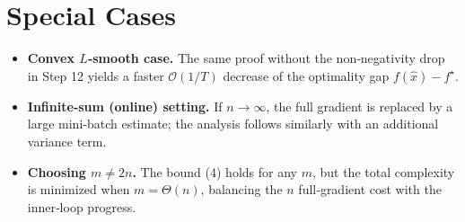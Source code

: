 \documentclass{article}
\begin{document}
\section*{Special Cases}
\begin{itemize}
\item \textbf{Convex $L$‑smooth case.} The same proof without the non‑negativity drop in Step 12 yields a faster $\mathcal{O}(1/T)$ decrease of the optimality gap $f(\hat{x})-f^{\star}$.
\item \textbf{Infinite‑sum (online) setting.} If $n\to\infty$, the full gradient is replaced by a large mini‑batch estimate; the analysis follows similarly with an additional variance term.
\item \textbf{Choosing $m\neq 2n$.} The bound (4) holds for any $m$, but the total complexity is minimized when $m=\Theta(n)$, balancing the $n$ full‑gradient cost with the inner‑loop progress.
\end{itemize}
\end{document}
